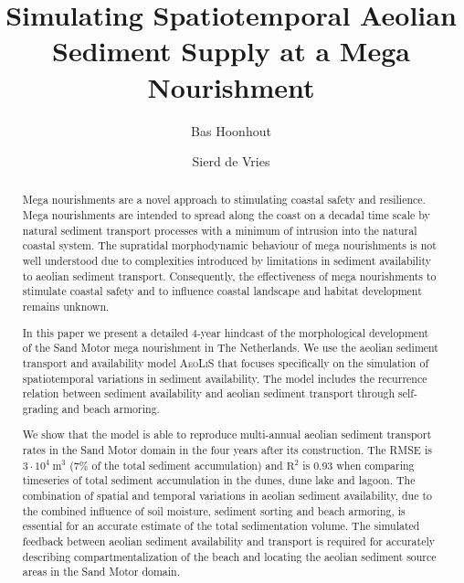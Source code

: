 \documentclass[preprint,12pt,authoryear]{elsarticle}
\begin{document}
\begin{frontmatter}

  \title{Simulating Spatiotemporal Aeolian Sediment Supply at a Mega Nourishment}

  \author[deltares]{Bas Hoonhout}

  \author[tudelft]{Sierd de Vries}

  \address[deltares]{Deltares, Department of Hydraulic Engineering,
    Boussinesqweg 1, 2629HV Delft, The Netherlands.}

  \address[tudelft]{Delft University of Technology, Faculty of Civil
    Engineering and Geosciences, Department of Hydraulic Engineering,
    Stevinweg 1, 2628CN Delft, The Netherlands.}

  \begin{abstract}
    Mega nourishments are a novel approach to stimulating coastal
    safety and resilience. Mega nourishments are intended to spread
    along the coast on a decadal time scale by natural sediment
    transport processes with a minimum of intrusion into the natural
    coastal system. The supratidal morphodynamic behaviour of mega
    nourishments is not well understood due to complexities introduced
    by limitations in sediment availability to aeolian sediment
    transport. Consequently, the effectiveness of mega nourishments to
    stimulate coastal safety and to influence coastal landscape and
    habitat development remains unknown.

    In this paper we present a detailed 4-year hindcast of the
    morphological development of the Sand Motor mega nourishment in
    The Netherlands. We use the aeolian sediment transport and
    availability model \textsc{AeoLiS} that focuses specifically on
    the simulation of spatiotemporal variations in sediment
    availability. The model includes the recurrence relation between
    sediment availability and aeolian sediment transport through
    self-grading and beach armoring.

    We show that the model is able to reproduce multi-annual aeolian
    sediment transport rates in the Sand Motor domain in the four
    years after its construction. The RMSE is $3 \cdot 10^4 ~
    \mathrm{m^3}$ (7\% of the total sediment accumulation) and
    $\mathrm{R^2}$ is 0.93 when comparing timeseries of total sediment
    accumulation in the dunes, dune lake and lagoon. The combination
    of spatial and temporal variations in aeolian sediment
    availability, due to the combined influence of soil moisture,
    sediment sorting and beach armoring, is essential for an accurate
    estimate of the total sedimentation volume. The simulated feedback
    between aeolian sediment availability and transport is required
    for accurately describing compartmentalization of the beach and
    locating the aeolian sediment source areas in the Sand Motor
    domain.
    

\end{abstract}
\end{frontmatter}
\end{document}
